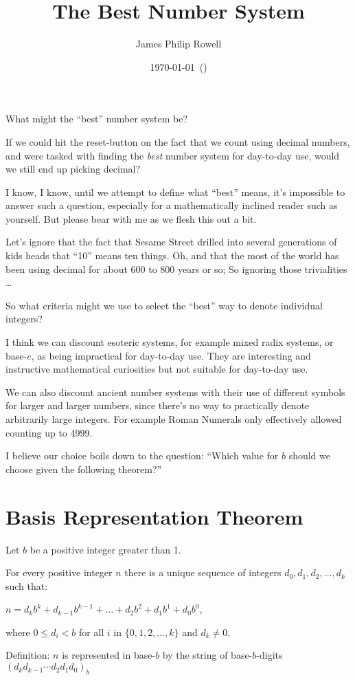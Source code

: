 \documentclass{article}
\title{\vspace{-1.5cm}The Best Number System}
\author{James Philip Rowell}
\date{\vspace{-0.5cm}\footnotesize\today\ (\jprVersion)} %
\newenvironment{jprIn}{\begin{adjustwidth}{2em}{}}{\end{adjustwidth}}
\begin{document}
\maketitle
\begin{em}
\centerline{\small{}What might the ``best'' number system be?}
\end{em}

If we could hit the reset-button on the fact that we count
using decimal numbers, and were tasked with finding the \emph{best} number system for day-to-day use,
would we still end up picking decimal?

I know, I know, until we attempt to define what ``best'' means, it's impossible to
answer such a question, especially for a mathematically inclined reader such as yourself.
But please bear with me as we flesh this out a bit.

Let's ignore that the fact
that Sesame Street drilled into several generations of kids heads
that ``10'' means ten things. Oh, and that the most of the world
has been using decimal for about 600 to 800 years or so; So ignoring those
trivialities
\dots{}

So what criteria might we use to select the ``best'' way to denote individual integers?

I think we can discount esoteric systems, for example mixed radix systems,
or base-\(e\), as being impractical for day-to-day use. They are interesting
and instructive mathematical curiosities but not suitable for day-to-day use.

We can also discount ancient number systems with their 
use of
different symbols for larger and larger numbers, since there's no way to practically
denote arbitrarily large integers. 
For example Roman Numerals only effectively allowed counting up to 4999.

I believe our choice boils down to the question: ``Which value for \(b\) should we choose given the following theorem?''

\section*{Basis Representation Theorem}
\begin{jprIn}
Let $b$ be a positive integer greater than 1.

For every positive integer $n$ there is a unique sequence
of integers $d_0, d_1, d_2,\dots{},d_k$ such that:

\hspace{3em}$n=d_kb^k+d_{k-1}b^{k-1}+\dots+d_2b^2+d_1b^1+d_0b^0$,

where $0\le{}d_i<b$ for all $i$ in $\{0,1,2,\dots{},k\}$ and $d_k\ne0$.

Definition: $n$ is represented in base-$b$ by the string
of base-$b$-digits $(d_kd_{k-1}{\cdots}d_2d_1d_0)_b$
\end{jprIn}
\end{document}
